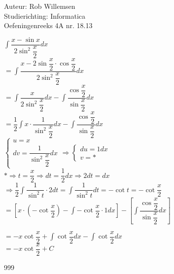 \documentclass[a4paper]{article}
\newcommand{\dint}{\displaystyle\int}
\begin{document}
\noindent \large Auteur: Rob Willemsen \\
\noindent \large Studierichting: Informatica \\
\noindent \large Oefeningenreeks 4A nr. 18.13 \\

\medskip

\normalsize

$\dint \dfrac{x - \sin x}{2\sin^2\dfrac{x}{2}} dx$ \\

$= \dint \dfrac{x-2\sin\dfrac{x}{2} \cdot \cos\dfrac{x}{2}}{2\sin^2\dfrac{x}{2}} dx$ \\

$= \dint \dfrac{x}{2\sin^2\dfrac{x}{2}} dx - \dint \dfrac{\cos\dfrac{x}{2}}{\sin\dfrac{x}{2}} dx$ \\

$= \dfrac{1}{2} \dint x \cdot \dfrac{1}{\sin^2 \dfrac{x}{2}} dx - \dint \dfrac{\cos\dfrac{x}{2}}{\sin\dfrac{x}{2}} dx$ \\

$ \left\{
\begin{array}{l}
u = x \\
dv = \dfrac{1}{\sin^2\dfrac{x}{2}} dx
\end{array} \right.
\Rightarrow
\left\{
\begin{array}{l}
du = 1dx \\
v = *
\end{array} 
\right.$ \\

$* \Rightarrow t = \dfrac{x}{2} \Rightarrow dt = \dfrac{1}{2}dx \Rightarrow 2dt = dx$ \\

$ \Rightarrow \dfrac{1}{2} \dint \dfrac{1}{\sin^2 t} \cdot 2dt = \dint \dfrac{1}{\sin^2 t} dt = -\cot t = -\cot \dfrac{x}{2} $\\

$= \left[ x \cdot \left(- \cot \dfrac{x}{2}\right) - \dint -\cot \dfrac{x}{2} \cdot 1dx \right] - \left[ \dint \dfrac{\cos \dfrac{x}{2}}{\sin \dfrac{x}{2}} dx\right]$

$= -x \cot \dfrac{x}{2} + \dint \cot \dfrac{x}{2} dx - \dint \cot \dfrac{x}{2} dx$\\

$= -x \cot \dfrac{x}{2} + C$

\begin{thebibliography}{999}
\end{thebibliography}
\end{document}

